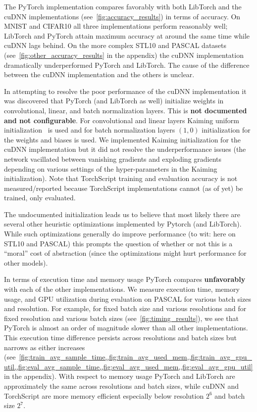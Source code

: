 

The PyTorch implementation compares favorably with both LibTorch and the cuDNN implementations (see~\cref{fig:accuracy_results}) in terms of accuracy.
On MNIST and CIFAR10 all three implementations perform reasonably well;
LibTorch and PyTorch attain maximum accuracy at around the same time while cuDNN lags behind.
On the more complex STL10 and PASCAL datasets (see~\cref{fig:other_accuracy_results} in the appendix) the cuDNN implementation dramatically underperformed PyTorch and LibTorch.
The cause of the difference between the cuDNN implementation and the others is unclear.

In attempting to resolve the poor performance of the cuDNN implementation it was discovered that PyTorch (and LibTorch as well) initialize weights in convolutional, linear, and batch normalization layers.
This is \textbf{not documented and not configurable}.
For convolutional and linear layers Kaiming uniform initialization~\cite{he2015delving} is used and for batch normalization layers $(1,0)$ initialization for the weights and biases is used.
We implemented Kaiming initialization for the cuDNN implementation but it did not resolve the underperformance issues (the network vacillated between vanishing gradients and exploding gradients depending on various settings of the hyper-parameters in the Kaiming initialization).
Note that TorchScript training and evaluation accuracy is not measured/reported because TorchScript implementations cannot (as of yet) be trained, only evaluated.

The undocumented initialization leads us to believe that most likely there are several other heuristic optimizations implemented by Pytorch (and LibTorch).
While such optimizations generally do improve performance (to wit: here on STL10 and PASCAL) this prompts the question of whether or not this is a ``moral'' cost of abstraction (since the optimizations might hurt performance for other models).



In terms of execution time and memory usage PyTorch compares \textbf{unfavorably} with each of the other implementations.
We measure execution time, memory usage, and GPU utilization during evaluation on PASCAL for various batch sizes and resolution.
For example, for fixed batch size and various resolutions and for fixed resolution and various batch sizes (see~\cref{fig:timing_results}), we see that PyTorch is almost an order of magnitude slower than all other implementations.
This execution time difference persists across resolutions and batch sizes but narrows as either increases (see~\cref{fig:train_avg_sample_time,,fig:train_avg_used_mem,,fig:train_avg_gpu_util,,fig:eval_avg_sample_time,,fig:eval_avg_used_mem,,fig:eval_avg_gpu_util} in the appendix).
With respect to memory usage PyTorch and LibTorch are approximately the same across resolutions and batch sizes, while cuDNN and TorchScript are more memory efficient especially below resolution $2^6$ and batch size $2^7$.

